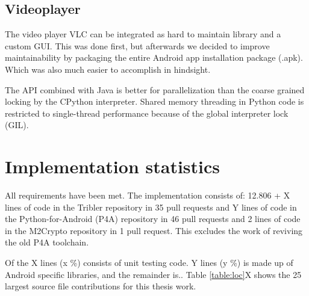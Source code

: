 \subsection{Videoplayer}
The video player VLC can be integrated as hard to maintain library and a custom GUI.
This was done first, but afterwards we decided to improve maintainability by packaging the entire Android app installation package (.apk).
Which was also much easier to accomplish in hindsight.

The API combined with Java is better for parallelization than the coarse grained locking by the CPython interpreter.
Shared memory threading in Python code is restricted to single-thread performance because of the global interpreter lock (GIL).



\section{Implementation statistics}
All requirements have been met.
The implementation consists of:
12.806 + X lines of code in the Tribler repository in 35 pull requests and
Y lines of code in the Python-for-Android (P4A) repository in 46 pull requests and
2 lines of code in the M2Crypto repository in 1 pull request.
This excludes the work of reviving the old P4A toolchain.

Of the X lines (x \%) consists of unit testing code.
Y lines (y \%) is made up of Android specific libraries, and the remainder is..
Table \ref{table:loc}X shows the 25 largest source file contributions for this thesis work. 

